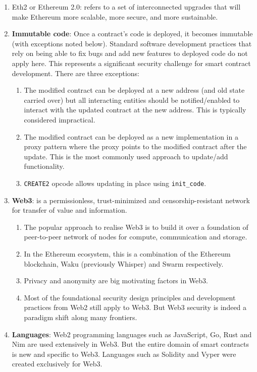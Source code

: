 \begin{enumerate}
\item Eth2 or Ethereum 2.0: refers to a set of interconnected upgrades that will make Ethereum more scalable, more secure, and more sustainable.

\item\textbf{Immutable code}: Once a contract's code is deployed, it becomes immutable (with exceptions noted below). Standard software development practices that rely on being able to fix bugs and add new features to deployed code do not apply here. This represents a significant security challenge for smart contract development. There are three exceptions:
\begin{enumerate}
\item The modified contract can be deployed at a new address (and old state carried over) but all interacting entities should be notified/enabled to interact with the updated contract at the new address. This is typically considered impractical.
\item The modified contract can be deployed as a new implementation in a proxy pattern where the proxy points to the modified contract after the update. This is the most commonly used approach to update/add functionality.
\item\verb|CREATE2| opcode allows updating in place using \verb|init_code|.
\end{enumerate}

\item\textbf{Web3}: is a permissionless, trust-minimized and censorship-resistant network for transfer of value and information.
\begin{enumerate}
\item The popular approach to realise Web3 is to build it over a foundation of peer-to-peer network of nodes for compute, communication and storage.
\item In the Ethereum ecosystem, this is a combination of the Ethereum blockchain, Waku (previously Whisper) and Swarm respectively.
\item Privacy and anonymity are big motivating factors in Web3.
\item Most of the foundational security design principles and development practices from Web2 still apply to Web3. But Web3 security is indeed a paradigm shift along many frontiers.
\end{enumerate}

\item\textbf{Languages}: Web2 programming languages such as JavaScript, Go, Rust and Nim are used extensively in Web3. But the entire domain of smart contracts is new and specific to Web3. Languages such as Solidity and Vyper were created exclusively for Web3.


\end{enumerate}
